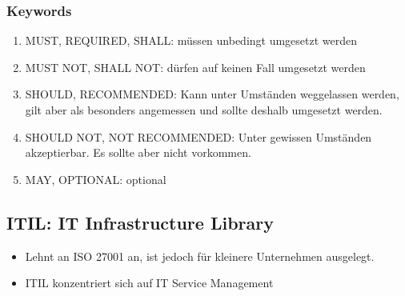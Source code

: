 \subsubsection{Keywords}
\begin{enumerate}
	\item MUST, REQUIRED, SHALL: müssen unbedingt umgesetzt werden
	\item MUST NOT, SHALL NOT: dürfen auf keinen Fall umgesetzt werden
	\item SHOULD, RECOMMENDED: Kann unter Umständen weggelassen werden, gilt aber als besonders angemessen und sollte deshalb umgesetzt werden.
	\item SHOULD NOT, NOT RECOMMENDED: Unter gewissen Umständen akzeptierbar. Es sollte aber nicht vorkommen.
	\item MAY, OPTIONAL: optional
\end{enumerate}

\subsection{ITIL: IT Infrastructure Library}
\begin{itemize}
	\item Lehnt an ISO 27001 an, ist jedoch für kleinere Unternehmen ausgelegt.
	\item ITIL konzentriert sich auf IT Service Management
\end{itemize}

